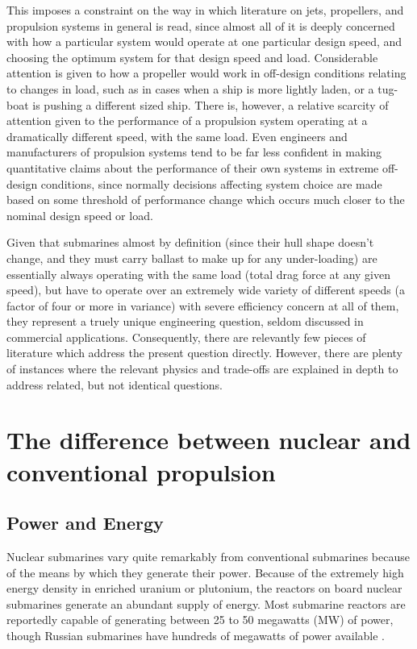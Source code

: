 \documentclass{article}\usepackage[]{graphicx}\usepackage[]{color}
\begin{document}
This imposes a constraint on the way in which literature on jets, propellers, and propulsion systems in general is read, since almost all of it is deeply concerned with how a particular system would operate at one particular design speed, and choosing the optimum system for that design speed and load.  Considerable attention is given to how a propeller would work in off-design conditions relating to changes in load, such as in cases when a ship is more lightly laden, or a tug-boat is pushing a different sized ship.  There is, however, a relative scarcity of attention given to the performance of a propulsion system operating at a dramatically different speed, with the same load. Even engineers and manufacturers of propulsion systems tend to be far less confident in making quantitative claims about the performance of their own systems in extreme off-design conditions, since normally decisions affecting system choice are made based on some threshold of performance change which occurs much closer to the nominal design speed or load.

Given that submarines almost by definition (since their hull shape doesn't change, and they must carry ballast to make up for any under-loading) are essentially always operating with the same load (total drag force at any given speed), but have to operate over an extremely wide variety of different speeds (a factor of four or more in variance) with severe efficiency concern at all of them, they represent a truely unique engineering question, seldom discussed in commercial applications.  Consequently, there are relevantly few pieces of literature which address the present question directly. However, there are plenty of instances where the relevant physics and trade-offs are explained in depth to address related, but not identical questions.

\section{The difference between nuclear and conventional propulsion}

\subsection{Power and Energy}
Nuclear submarines vary quite remarkably from conventional submarines because of the means by which they generate their power.  Because of the extremely high energy density in enriched uranium or plutonium, the reactors on board nuclear submarines generate an abundant supply of energy.  Most submarine reactors are reportedly capable of generating between 25 to 50 megawatts (MW) of power, though Russian submarines have hundreds of megawatts of power available \parencite{WNA2017}.
\end{document}
